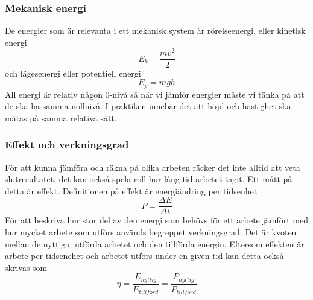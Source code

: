 \documentclass[11pt]{beamer}
\begin{document}
    \begin{frame}
        \frametitle{Mekanisk energi}
        De energier som är relevanta i ett mekanisk system är rörelseenergi, eller kinetisk energi
        \begin{equation}
            E_k = \frac{mv^2}{2}
        \end{equation}
        och lägesenergi eller potentiell energi
        \begin{equation}
            E_p = mgh
        \end{equation}
        All energi är relativ någon 0-nivå så när vi jämför energier måste vi tänka på att de ska ha samma nollnivå.
        I praktiken innebär det att höjd och hastighet ska mätas på samma relativa sätt.
    \end{frame}
    \begin{frame}
        \frametitle{Effekt och verkningsgrad}
        För att kunna jämföra och räkna på olika arbeten räcker det inte alltid att veta slutresultatet, det kan också
        spela roll hur lång tid arbetet tagit. Ett mått på detta är effekt. Definitionen på effekt är energiändring per tidsenhet
        \begin{equation}
            P = \frac{\Delta E}{\Delta t}
        \end{equation}
        För att beskriva hur stor del av den energi som behövs för ett arbete jämfört med hur mycket arbete som utförs
        används begreppet verkningsgrad.  Det är kvoten mellan de nyttiga, utförda arbetet och den tillförda energin.
        Eftersom effekten är arbete per tidsenehet och arbetet utförs under en given tid kan detta också skrivas som
        \begin{equation}
            \eta = \frac{E_{nyttig}}{E_{tillförd}} = \frac{P_{nyttig}}{P_{tillförd}}
        \end{equation}

    \end{frame}
\end{document}
